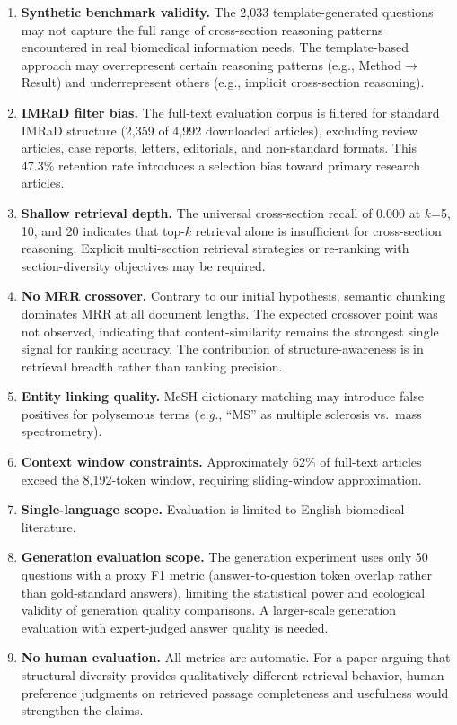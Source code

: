 \documentclass[sn-basic]{sn-jnl}
\newcommand{\eg}{\textit{e.g.}}
\begin{document}
\begin{enumerate}
  \item \textbf{Synthetic benchmark validity.} The 2{,}033 template-generated questions may not capture the full range of cross-section reasoning patterns encountered in real biomedical information needs. The template-based approach may overrepresent certain reasoning patterns (e.g., Method$\to$Result) and underrepresent others (e.g., implicit cross-section reasoning).
  \item \textbf{IMRaD filter bias.} The full-text evaluation corpus is filtered for standard IMRaD structure (2{,}359 of 4{,}992 downloaded articles), excluding review articles, case reports, letters, editorials, and non-standard formats. This 47.3\% retention rate introduces a selection bias toward primary research articles.
  \item \textbf{Shallow retrieval depth.} The universal cross-section recall of 0.000 at $k$=5, 10, and 20 indicates that top-$k$ retrieval alone is insufficient for cross-section reasoning. Explicit multi-section retrieval strategies or re-ranking with section-diversity objectives may be required.
  \item \textbf{No MRR crossover.} Contrary to our initial hypothesis, semantic chunking dominates MRR at all document lengths. The expected crossover point was not observed, indicating that content-similarity remains the strongest single signal for ranking accuracy. The contribution of structure-awareness is in retrieval breadth rather than ranking precision.
  \item \textbf{Entity linking quality.} MeSH dictionary matching may introduce false positives for polysemous terms (\eg, ``MS'' as multiple sclerosis vs.\ mass spectrometry).
  \item \textbf{Context window constraints.} Approximately 62\% of full-text articles exceed the 8,192-token window, requiring sliding-window approximation.
  \item \textbf{Single-language scope.} Evaluation is limited to English biomedical literature.
  \item \textbf{Generation evaluation scope.} The generation experiment uses only 50 questions with a proxy F1 metric (answer-to-question token overlap rather than gold-standard answers), limiting the statistical power and ecological validity of generation quality comparisons. A larger-scale generation evaluation with expert-judged answer quality is needed.
  \item \textbf{No human evaluation.} All metrics are automatic. For a paper arguing that structural diversity provides qualitatively different retrieval behavior, human preference judgments on retrieved passage completeness and usefulness would strengthen the claims.
\end{enumerate}
\end{document}
